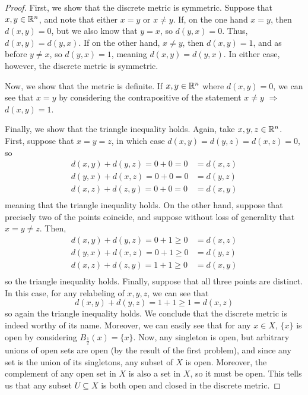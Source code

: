 \documentclass[./main.tex]{subfiles}
\begin{document}
\begin{proof}
    First, we show that the discrete metric is symmetric. Suppose that $x,y\in\mathbb{R}^n$, and note that either $x=y$ or $x\neq y$.
    If, on the one hand $x=y$, then $d(x,y)=0$, but we also know that $y=x$, so $d(y,x)=0$. Thus, $d(x,y)=d(y,x)$. If on the
    other hand, $x\neq y$, then $d(x,y)=1$, and as before $y\neq x$, so $d(y,x)=1$, meaning $d(x,y)=d(y,x)$. In either case,
    however, the discrete metric is symmetric.
    \medskip

    Now, we show that the metric is definite. If $x,y\in\mathbb{R}^n$ where $d(x,y)=0$, we can see that $x=y$ by considering the
    contrapositive of the statement $x\neq y$ $\Rightarrow$ $d(x,y)=1$.
    \medskip

    Finally, we show that the triangle inequality holds. Again, take $x,y,z\in\mathbb{R}^n$. First, suppose that $x=y=z$, in which
    case $d(x,y)=d(y,z)=d(x,z)=0$, so 
    \begin{align*}
        d(x,y) + d(y,z) = 0+0 = 0 &= d(x,z)\\ 
        d(y,x) + d(x,z) = 0+0 = 0 &= d(y,z)\\
        d(x,z) + d(z,y) = 0+0 = 0 &= d(x,y)\\
    \end{align*}
    meaning that the triangle inequality holds. On the other
    hand, suppose that precisely two of the points coincide, and suppose without loss of generality that $x=y\neq z$. Then,
    \begin{align*}
        d(x,y) + d(y,z) = 0+1 \geq 0 &= d(x,z)\\ 
        d(y,x) + d(x,z) = 0+1 \geq 0 &= d(y,z)\\
        d(x,z) + d(z,y) = 1+1 \geq 0 &= d(x,y)\\
    \end{align*}
    so the triangle inequality holds. Finally, suppose that all three points are distinct. In this case, for any relabeling of $x,y,z$,
    we can see that
    \[
        d(x,y)+d(y,z)= 1+1\geq 1 = d(x,z)
    \]
    so again the triangle inequality holds. We conclude that the discrete metric is indeed worthy of its name. Moreover, we can easily
    see that for any $x\in X$, $\{x\}$ is open by considering $B_{\frac{1}{2}}(x)=\{x\}$. Now, any singleton is open, but arbitrary unions
    of open sets are open (by the result of the first problem), and since any set is the union of its singletons, any subset of $X$ is open.
    Moreover, the complement of any open set in $X$ is also a set in $X$, so it must be open. This tells us that any subset $U\subseteq X$ is
    both open and closed in the discrete metric. 
\end{proof}
\end{document}
